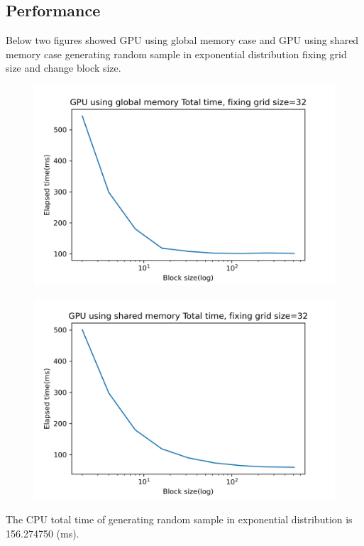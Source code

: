 \documentclass{article}
\begin{document}
	\subsection{Performance}
	Below two figures showed GPU using global memory case and GPU using shared memory case generating random sample in exponential distribution fixing grid size and change block size.
	\begin{figure}[hb!]
		\centering
		\includegraphics[width=\linewidth]{notebook/gpu_gmem_total_time_fix_grid}
	\end{figure}
	\begin{figure}
		\centering
		\includegraphics[width=\linewidth]{notebook/gpu_shmem_total_time_fix_grid}
	\end{figure}
	\newpage
	The CPU total time of generating random sample in exponential distribution is 156.274750 (ms).
	
\end{document}

